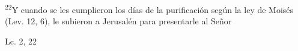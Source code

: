 \documentclass[../../rosario.tex]{subfiles}
\begin{document}
    \textsuperscript{22}Y cuando se les cumplieron los días de la purificación según la ley de Moisés (Lev. 12, 6), le subieron a Jerusalén para presentarle al Señor
    \begin{flushright}
    Lc. 2, 22         
    \end{flushright}
\end{document}
